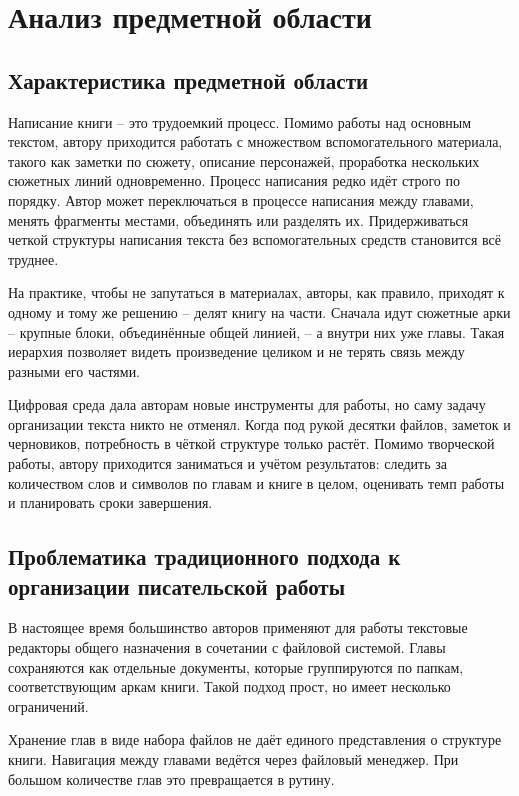 \section{Анализ предметной области}

\subsection{Характеристика предметной области}

Написание книги -- это трудоемкий процесс. Помимо работы над основным текстом, автору приходится работать с множеством вспомогательного материала, такого как заметки по сюжету, описание персонажей, проработка нескольких сюжетных линий одновременно. Процесс написания редко идёт строго по порядку. Автор может переключаться в процессе написания между главами, менять фрагменты местами, объединять или разделять их. Придерживаться четкой структуры написания текста без вспомогательных средств становится всё труднее.

На практике, чтобы не запутаться в материалах, авторы, как правило, приходят к одному и тому же решению -- делят книгу на части. Сначала идут сюжетные арки -- крупные блоки, объединённые общей линией, -- а внутри них уже главы. Такая иерархия позволяет видеть произведение целиком и не терять связь между разными его частями.

Цифровая среда дала авторам новые инструменты для работы, но саму задачу организации текста никто не отменял. Когда под рукой десятки файлов, заметок и черновиков, потребность в чёткой структуре только растёт. Помимо творческой работы, автору приходится заниматься и учётом результатов: следить за количеством слов и символов по главам и книге в целом, оценивать темп работы и планировать сроки завершения.

\subsection{Проблематика традиционного подхода к организации писательской работы}

В настоящее время большинство авторов применяют для работы текстовые редакторы общего назначения в сочетании с файловой системой. Главы сохраняются как отдельные документы, которые группируются по папкам, соответствующим аркам книги. Такой подход прост, но имеет несколько ограничений.

Хранение глав в виде набора файлов не даёт единого представления о структуре книги. Навигация между главами ведётся через файловый менеджер. При большом количестве глав это превращается в рутину.

